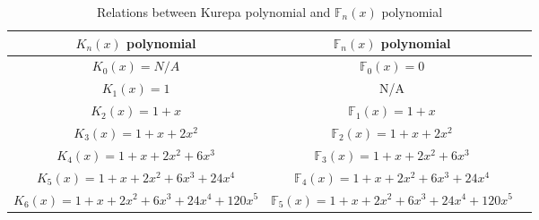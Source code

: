 \documentclass[pdflatex,sn-mathphys-num]{sn-jnl}%
\newtheorem{theorem}{Theorem}
\theoremstyle{thmstyleone}%
\theoremstyle{thmstyletwo}%
\theoremstyle{thmstylethree}%
\begin{document}
    \begin{table}[!ht]\label{6T}
    \centering
    \begin{tabular}{|c|c|c|}\hline 
        $K_n(x)$ polynomial& $ \mathbb{F}_{n}(x)$ polynomial   \\\hline 
          $K_0(x) = N/A$ & $\mathbb{F}_0(x) = 0$ \\\hline \rowcolor{LightCyan}
        $K_1(x) = 1 $ & N/A  \\\hline
         $K_2(x) = 1 + x $ & $\mathbb{F}_1(x) = 1 + x$  \\\hline
          $K_3(x) = 1 + x + 2x^2$ & $\mathbb{F}_2(x) = 1 + x + 2x^2$  \\\hline
            $K_4(x) = 1 + x + 2x^2 + 6x^3$ & $\mathbb{F}_3(x) = 1 + x + 2x^2 + 6x^3$ \\\hline
              $K_5(x) = 1 + x + 2x^2 + 6x^3 + 24x^4$ & $\mathbb{F}_4(x) = 1 + x + 2x^2 + 6x^3 + 24x^4$   \\\hline
                $K_6(x) = 1 + x + 2x^2 + 6x^3 + 24x^4 + 120x^5$ & $\mathbb{F}_5(x) = 1 + x + 2x^2 + 6x^3 + 24x^4 + 120x^5$   \\\hline
    \end{tabular}
    \caption{Relations between Kurepa polynomial and $\mathbb{F}_n(x)$ polynomial \cite{OEIS:A003422} }
    \label{table 11}
\end{table}












\end{document}
